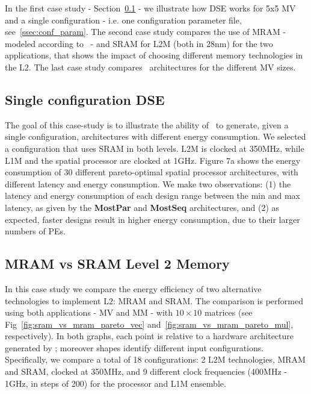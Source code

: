 In the first case study - Section~\ref{ssec:exp_single} - we illustrate how DSE works for 5x5 MV and a single configuration - i.e. one configuration parameter file, see~\ref{ssec:conf_param}. The second case study compares the use of MRAM - modeled according to~\cite{8310393} - and SRAM for L2M (both in 28nm) for the two applications, that shows the impact of choosing different memory technologies in the L2. The last case study compares \frameworkname~architectures for the different MV sizes.

\vspace{-1mm}
\subsection{Single configuration DSE}
\label{ssec:exp_single}
\vspace{-1mm}
The goal of this case-study is to illustrate the ability of \frameworkname~to generate, given a single configuration, architectures with different energy consumption. We selected a configuration that uses SRAM in both levels. L2M is clocked at 350MHz, while L1M and the spatial processor are clocked at 1GHz. Figure 7a shows the energy consumption of 30 different pareto-optimal spatial processor architectures, with different latency and energy consumption. We make two observations: (1) the latency and energy consumption of each design range between the min and max latency, as given by the \textbf{MostPar} and \textbf{MostSeq} architectures, and (2) as expected, faster designs result in higher energy consumption, due to their larger numbers of PEs.


\vspace{-1mm}
\subsection{MRAM vs SRAM Level 2 Memory}
\label{ssec:case_study2}
\vspace{-1mm}

In this case study we compare the energy efficiency of two alternative technologies to implement L2: MRAM and SRAM.
The comparison is performed using both applications - MV and MM - with $10\times10$ matrices (see Fig~\ref{fig:sram_vs_mram_pareto_vec} and~\ref{fig:sram_vs_mram_pareto_mul}, respectively). In both graphs, each point is relative to a hardware architecture generated by \frameworkname; moreover shapes identify different input configurations. Specifically, we compare a total of 18 configurations: 2 L2M technologies, MRAM and SRAM, clocked at 350MHz, and 9 different clock frequencies (400MHz - 1GHz, in steps of 200) for the processor and L1M ensemble.

